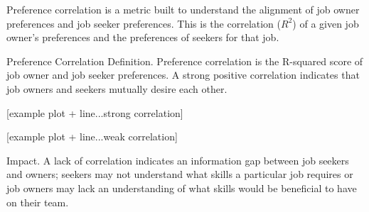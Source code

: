 Preference correlation is a metric built to understand the alignment of job owner preferences and job seeker preferences. This is the correlation ($R^2$) of a given job owner's preferences and the preferences of seekers for that job. 

Preference Correlation
Definition.
Preference correlation is the R-squared score of job owner and job seeker preferences.  A strong positive correlation indicates that job owners and seekers mutually desire each other. 

[example plot + line...strong correlation]

[example plot + line...weak correlation]

Impact. 
A lack of correlation indicates an information gap between job seekers and owners; seekers may not understand what skills a particular job requires or job owners may lack an understanding of what skills would be beneficial to have on their team. 